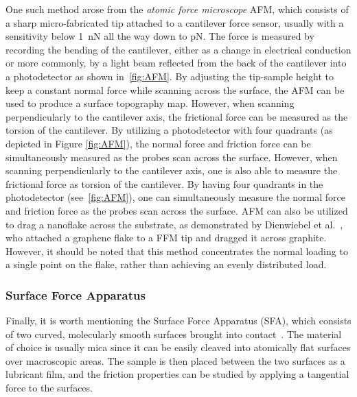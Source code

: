 One such method arose from the \textit{atomic force microscope} \acrshort{AFM}, which consists of a sharp micro-fabricated tip attached to a cantilever force sensor, usually with a sensitivity below \SI{1}{nN} all the way down to pN. The force is measured by recording the bending of
the cantilever, either as a change in electrical conduction or more commonly, by
a light beam reflected from the back of the cantilever into a photodetector
\cite[p. 183]{gnecco_meyer_2015} as shown in~\cref{fig:AFM}. By adjusting the tip-sample height to keep a constant normal force while scanning across the surface, the \acrshort{AFM} can be used to produce a
surface topography map.  However, when scanning perpendicularly to the cantilever axis, the frictional force can be measured as the torsion of the cantilever. By utilizing a photodetector with four quadrants (as depicted in Figure \ref{fig:AFM}), the normal force and friction force can be simultaneously measured as the probes scan across the surface. However, when scanning
perpendicularly to the cantilever axis, one is also able to measure the
frictional force as torsion of the cantilever. By having four quadrants in the
photodetector (see~\cref{fig:AFM}), one can simultaneously
measure the normal force and friction force as the probes scan across the
surface. \acrshort{AFM} can also be utilized to drag a nanoflake across the substrate, as demonstrated by Dienwiebel et al.~\cite{DIENWIEBEL2005197}, who attached a graphene flake to a \acrshort{FFM} tip and dragged it across graphite. However, it should be noted that this method concentrates the normal loading to a single point on the flake, rather than achieving an evenly distributed load.


\subsubsection{Surface Force Apparatus}
Finally, it is worth mentioning the Surface Force Apparatus (\acrshort{SFA}), which consists of two curved, molecularly smooth surfaces brought into contact~\cite[p. 188]{gnecco_meyer_2015}. The material of choice is usually mica since it can be easily cleaved into atomically flat surfaces over macroscopic areas. The sample is then placed between the two surfaces as a lubricant film, and the friction properties can be studied by applying a tangential force to the surfaces.

